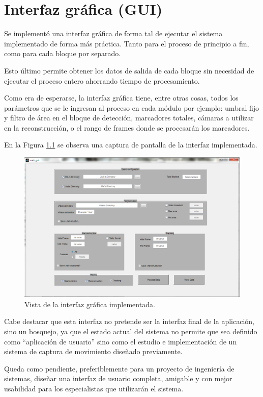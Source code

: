 \chapter{Interfaz gráfica (GUI)}

Se implementó una interfaz gráfica de forma tal de ejecutar el sistema implementado de forma más práctica. Tanto para el proceso de principio a fin, como para cada bloque por separado.

Esto último permite obtener los datos de salida de cada bloque sin necesidad de ejecutar el proceso entero ahorrando tiempo de procesamiento.

Como era de esperarse, la interfaz gráfica tiene, entre otras cosas, todos los parámetros que se le ingresan al proceso en cada módulo por ejemplo: umbral fijo y filtro de área en el bloque de detección, marcadores totales, cámaras a utilizar en la reconstrucción, o el rango de frames donde se procesarán los marcadores.

En la Figura \ref{guiVent} se observa una captura de pantalla de la interfaz implementada.

\begin{figure}[H]
\hspace{-1cm}
\includegraphics[scale=0.54]{img/gui.png}
\caption{Vista de la interfaz gráfica implementada.}
\label{guiVent}
\end{figure}

Cabe destacar que esta interfaz no pretende ser la interfaz final de la aplicación, sino un bosquejo, ya que el estado actual del sistema no permite que sea definido como ``aplicación de usuario'' sino como el estudio e implementación de un sistema de captura de movimiento diseñado previamente.

Queda como pendiente, preferiblemente para un proyecto de ingeniería de sistemas, diseñar una interfaz de usuario completa, amigable y con mejor usabilidad para los especialistas que utilizarán el sistema.